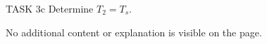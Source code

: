 TASK 3c  
Determine \( T_2 = T_s \).  

No additional content or explanation is visible on the page.